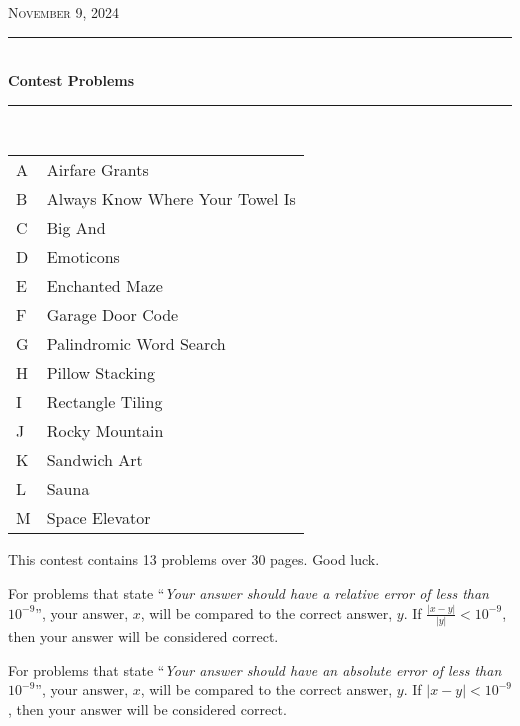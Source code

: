 \documentclass[letter,11pt,noproblemids]{problemset}
\newcommand{\HRule}{\rule{\linewidth}{0.5mm}}
\begin{document}
%

\newpage

\begin{center}
\textsc{\Large November 9, 2024}\\[0.3cm]

\HRule \\[0.3cm]

{ \huge \bfseries Contest Problems \\[0.3cm] }

\HRule \\[0.5cm]


{\large
  \begin{tabular}{l@{:\hskip4pt}l}
    A & Airfare Grants \\
    B & Always Know Where Your Towel Is \\
    C & Big And \\
    D & Emoticons \\
    E & Enchanted Maze \\
    F & Garage Door Code \\
    G & Palindromic Word Search \\
    H & Pillow Stacking \\
    I & Rectangle Tiling \\
    J & Rocky Mountain \\
    K & Sandwich Art \\
    L & Sauna \\
    M & Space Elevator \\
  \end{tabular}
}
\vspace*{\fill}
\end{center}

\newpage
\begin{center}
This contest contains 13 problems over 30 pages. Good luck.
\end{center}

\vskip 20pt

For problems that state ``\textit{Your answer should have a relative
  error of less than $10^{-9}$}'', your answer, $x$, will be compared
to the correct answer, $y$. If 
$\frac{|x-y|}{|y|} < 10^{-9}$, then your answer will be considered
correct.



For problems that state ``\textit{Your answer should have an absolute error of less than $10^{-9}$}'', your answer, $x$, will be compared to the correct answer, $y$. If $|x-y| < 10^{-9}$, then your answer will be considered correct.
\end{document}
